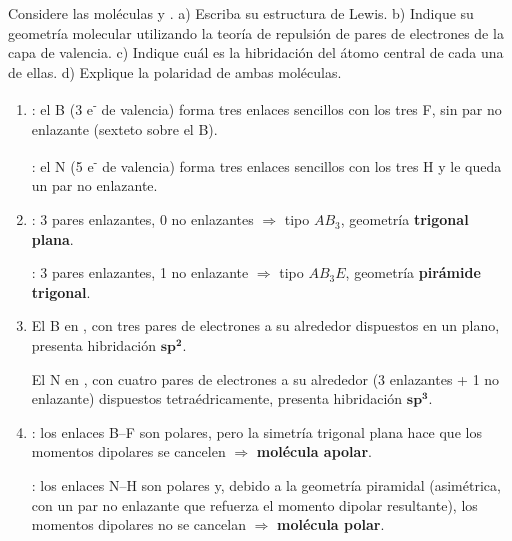 \begin{exerciseEVAU}
    Considere las moléculas  y . a) Escriba su estructura de Lewis. b) Indique su geometría molecular utilizando la teoría de repulsión de pares de electrones de la capa de valencia. c) Indique cuál es la hibridación del átomo central de cada una de ellas. d) Explique la polaridad de ambas moléculas.

    \begin{solu}
        \begin{enumerate}[label=\letraminuscula]
            \item \textbf{}: el B (3 e\textsuperscript{-} de valencia) forma tres enlaces sencillos con los tres F, sin par no enlazante (sexteto sobre el B).

            \textbf{}: el N (5 e\textsuperscript{-} de valencia) forma tres enlaces sencillos con los tres H y le queda un par no enlazante.

            \item \textbf{}: 3 pares enlazantes, 0 no enlazantes $\Rightarrow$ tipo \(AB_3\), geometría \textbf{trigonal plana}.

            \textbf{}: 3 pares enlazantes, 1 no enlazante $\Rightarrow$ tipo \(AB_3E\), geometría \textbf{pirámide trigonal}.

            \item El B en , con tres pares de electrones a su alrededor dispuestos en un plano, presenta hibridación \(\bm{sp^2}\).

            El N en , con cuatro pares de electrones a su alrededor (3 enlazantes + 1 no enlazante) dispuestos tetraédricamente, presenta hibridación \(\bm{sp^3}\).

            \item \textbf{}: los enlaces B--F son polares, pero la simetría trigonal plana hace que los momentos dipolares se cancelen $\Rightarrow$ \textbf{molécula apolar}.

            \textbf{}: los enlaces N--H son polares y, debido a la geometría piramidal (asimétrica, con un par no enlazante que refuerza el momento dipolar resultante), los momentos dipolares no se cancelan $\Rightarrow$ \textbf{molécula polar}.
        \end{enumerate}
    \end{solu}
\end{exerciseEVAU}


